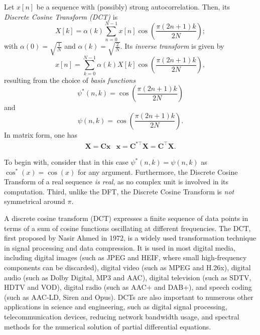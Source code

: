 \documentclass[\documentfontsize, twocolumn]{\classname}
\begin{document}
\begin{defin}
    Let $x[n]$ be a sequence with (possibly) strong autocorrelation. Then, its \emph{Discrete Cosine Transform (DCT)} is
    \begin{equation}\label{eqn:discreteCosineTransform}
        X[k] = \alpha(k) \sum_{n=0}^{N-1} x[n] \cos{\left(\frac{\pi(2n + 1)k}{2N}\right)};
    \end{equation}
    with $\alpha(0) = \sqrt{\frac 1 N}$ and $\alpha(k) = \sqrt{ \frac 2 N }$. Its \emph{inverse transform} is given by
    \begin{equation}\label{eqn:discreteCosineTransformInverse}
        x[n] = \sum_{k=0}^{N-1}\alpha(k)  X[k] \cos{\left(\frac{\pi(2n + 1)k}{2N}\right)},
    \end{equation}
    resulting from the choice of \emph{basis functions} \[\psi^*(n, k) = \cos{\left(\frac{\pi(2n + 1)k}{2N}\right)}\] and \[\psi(n, k) = \cos{\left(\frac{\pi(2n + 1)k}{2N}\right)}.\]
    In matrix form, one has
    \begin{equation}\label{eqn:discreteCosineTransformMatrixForm}
        \begin{array}{cc}
            \bm X = \bm{Cx} & \bm x = \bm C^{*\top} \bm X = \bm C^\top \bm X.
        \end{array}
    \end{equation}
\end{defin}

To begin with, consider that in this case $\psi^*(n, k) = \psi(n, k)$ as $\cos^*{(x)} = \cos{(x)}$ for any argument. Furthermore, the Discrete Cosine Transform of a real sequence \emph{is real}, as no complex unit is involved in its computation. Third, unlike the DFT, the Discrete Cosine Transform is \emph{not} symmetrical around $\pi$.

A discrete cosine transform (DCT) expresses a finite sequence of data points in terms of a sum of cosine functions oscillating at different frequencies. The DCT, first proposed by Nasir Ahmed in 1972, is a widely used transformation technique in signal processing and data compression. It is used in most digital media, including digital images (such as JPEG and HEIF, where small high-frequency components can be discarded), digital video (such as MPEG and H.26x), digital audio (such as Dolby Digital, MP3 and AAC), digital television (such as SDTV, HDTV and VOD), digital radio (such as AAC+ and DAB+), and speech coding (such as AAC-LD, Siren and Opus). DCTs are also important to numerous other applications in science and engineering, such as digital signal processing, telecommunication devices, reducing network bandwidth usage, and spectral methods for the numerical solution of partial differential equations.
\end{document}
